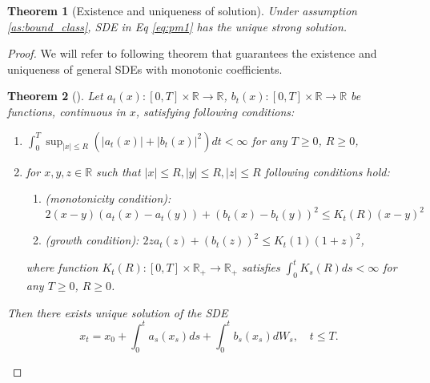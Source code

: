 \documentclass[pdftex,11pt,a4paper] {article}
\newtheorem{theorem}{Theorem}[section]
\begin{document}
\begin{theorem}[Existence and uniqueness of solution]\label{th:ExistQuadDrift}
Under assumption \ref{as:bound_class}, SDE in Eq \eqref{eq:pm1} has the unique strong solution.
\end{theorem}
\begin{proof}

We will refer to following theorem that guarantees the existence and uniqueness of general SDEs with monotonic coefficients.

\begin{theorem}[\cite{GyonKryl}]%
Let $a_t(x): [0,T]\times \mathbb{R}\to \mathbb{R}$, $b_t(x): [0,T]\times \mathbb{R}\to \mathbb{R}$ be functions, continuous in $x$, satisfying following conditions:
\begin{enumerate}
\item $\int_0^T \sup_{|x|\le R}\left(|a_t(x)| +|b_t(x)|^2\right)dt<\infty$ for any $T\ge 0$, $R\ge 0$,
\item for $x,y,z\in \mathbb{R}$ such that $|x|\le R, |y|\le R, |z|\le R$ following conditions hold:
\begin{enumerate}%
\item\label{it:monoton_cond}(monotonicity condition):
\begin{equation}
2(x-y)(a_t(x)-a_t(y))+(b_t(x)-b_t(y))^2\le K_t(R)(x-y)^2
\end{equation}
\item\label{it:growth_cond} (growth condition): $2za_t(z)+(b_t(z))^2\le K_t(1)(1+z)^2$,
\end{enumerate}
where function $K_t(R): [0,T]\times \mathbb{R}_+\to \mathbb{R}_+$ satisfies $\int_0^t K_s(R)ds<\infty$  for any $T\ge 0$, $R\ge 0$.
\end{enumerate}

Then there exists unique solution of the SDE
\begin{equation}
x_t=x_0+\int_0^ta_s(x_s)ds + \int_0^tb_s(x_s)dW_s,\quad t\le T.
\end{equation}
\end{theorem}


\end{proof}
\end{document}
